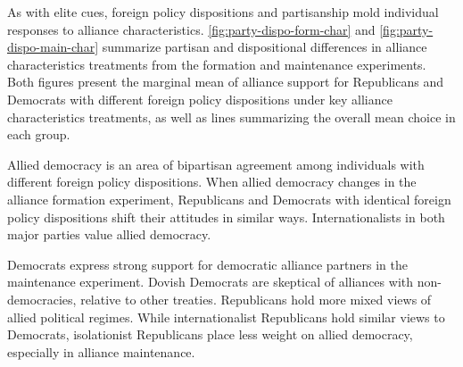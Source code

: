 \documentclass[12pt]{article}
\begin{document}
As with elite cues, foreign policy dispositions and partisanship mold individual responses to alliance characteristics. 
\autoref{fig:party-dispo-form-char} and \autoref{fig:party-dispo-main-char} summarize partisan and dispositional differences in alliance characteristics treatments from the formation and maintenance experiments. 
Both figures present the marginal mean of alliance support for Republicans and Democrats with different foreign policy dispositions under key alliance characteristics treatments, as well as lines summarizing the overall mean choice in each group. 


Allied democracy is an area of bipartisan agreement among individuals with different foreign policy dispositions.
When allied democracy changes in the alliance formation experiment, Republicans and Democrats with identical foreign policy dispositions shift their attitudes in similar ways. 
Internationalists in both major parties value allied democracy. 


Democrats express strong support for democratic alliance partners in the maintenance experiment. 
Dovish Democrats are skeptical of alliances with non-democracies, relative to other treaties. 
Republicans hold more mixed views of allied political regimes. 
While internationalist Republicans hold similar views to Democrats, isolationist Republicans place less weight on allied democracy, especially in alliance maintenance. 
\end{document}
